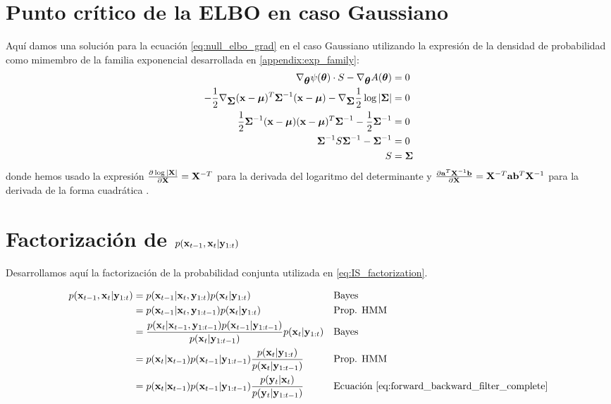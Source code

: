 \section{Punto crítico de la ELBO en caso Gaussiano}\label{appendix:null_grad_elbo}

Aquí damos una solución para la ecuación \ref{eq:null_elbo_grad} en el caso Gaussiano utilizando la expresión de la densidad de probabilidad como mimembro de la familia exponencial desarrollada en \ref{appendix:exp_family}:
\begin{align*}
    \nabla_{\mbox{\boldmath$ \theta $}} \psi(\mbox{\boldmath$ \theta $}) \cdot S - \nabla_{\mbox{\boldmath$ \theta $}} A(\mbox{\boldmath$ \theta $}) &= 0 \\
    -\frac{1}{2} \nabla_{\mbox{\boldmath$ \Sigma $}}  (\mathbf{x}- \mbox{\boldmath$ \mu $})^T \mbox{\boldmath$ \Sigma $}^{-1}(\mathbf{x}-\mbox{\boldmath$ \mu $}) - \nabla_{\mbox{\boldmath$ \Sigma $}} \frac{1}{2} \log |\mbox{\boldmath$ \Sigma $}| &= 0 \\
    \frac{1}{2} \mbox{\boldmath$ \Sigma $}^{-1} (\mathbf{x}- \mbox{\boldmath$ \mu $})(\mathbf{x}-\mbox{\boldmath$ \mu $})^T \mbox{\boldmath$ \Sigma $}^{-1} - \frac{1}{2} \mbox{\boldmath$ \Sigma $}^{-1} &= 0 \\
    \mbox{\boldmath$ \Sigma $}^{-1} S \mbox{\boldmath$ \Sigma $}^{-1} - \mbox{\boldmath$ \Sigma $}^{-1} &= 0 \\
    S &= \mbox{\boldmath$ \Sigma $} 
\end{align*}
donde hemos usado la expresión $\frac{\partial \log|\mathbf{X}|}{\partial \mathbf{X}} = \mathbf{X}^{-T}$ para la derivada del logaritmo del determinante y $\frac{\partial \mathbf{a}^T \mathbf{X}^{-1} \mathbf{b} }{\partial \mathbf{X}} = \mathbf{X}^{-T} \mathbf{a} \mathbf{b}^T \mathbf{X}^{-1}$ para la derivada de la forma cuadrática \cite{Petersen2012}.

\section{Factorización de $p(\mathbf{x}_{t-1}, \mathbf{x}_t| \mathbf{y}_{1:t})$} \label{appendix:IS_factorization}

Desarrollamos aquí la factorización de la probabilidad conjunta utilizada en \ref{eq:IS_factorization}.

\begin{align}
    p(\mathbf{x}_{t-1}, \mathbf{x}_t| \mathbf{y}_{1:t}) &= p(\mathbf{x}_{t-1} | \mathbf{x}_t, \mathbf{y}_{1:t}) p(\mathbf{x}_t| \mathbf{y}_{1:t}) && \text{Bayes} \\
    &= p(\mathbf{x}_{t-1} | \mathbf{x}_t, \mathbf{y}_{1:t-1}) p(\mathbf{x}_t| \mathbf{y}_{1:t}) && \text{Prop. HMM} \\
    &= \frac{p(\mathbf{x}_t| \mathbf{x}_{t-1}, \mathbf{y}_{1:t-1})p(\mathbf{x}_{t-1} | \mathbf{y}_{1:t-1})}{p(\mathbf{x}_t |\mathbf{y}_{1:t-1})} p(\mathbf{x}_t| \mathbf{y}_{1:t}) && \text{Bayes} \\
    &= p(\mathbf{x}_t| \mathbf{x}_{t-1})p(\mathbf{x}_{t-1} | \mathbf{y}_{1:t-1})\frac{p(\mathbf{x}_t| \mathbf{y}_{1:t})}{p(\mathbf{x}_t |\mathbf{y}_{1:t-1})} && \text{Prop. HMM} \\
    &= p(\mathbf{x}_t| \mathbf{x}_{t-1})p(\mathbf{x}_{t-1} | \mathbf{y}_{1:t-1})\frac{p(\mathbf{y}_t| \mathbf{x}_t)}{p(\mathbf{y}_t |\mathbf{y}_{1:t-1})} && \text{Ecuación \ref{eq:forward_backward_filter_complete}}
\end{align}

